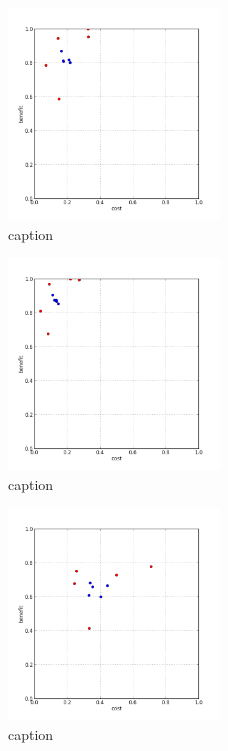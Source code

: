 %
\begin{figure}[!ht]
	\centering
	\includegraphics[width=0.5\textwidth]{img/p1figs/computeFrameStateCummulative_sectionCompareBetter_smooth12_tol24.png}
	\caption{caption}
\end{figure}
%
\begin{figure}[!ht]
	\centering
	\includegraphics[width=0.5\textwidth]{img/p1figs/computeFrameStateCummulative_sectionCompareBetter_smooth12_tol48.png}
	\caption{caption}
\end{figure}
%
\begin{figure}[!ht]
	\centering
	\includegraphics[width=0.5\textwidth]{img/p1figs/computeFrameStateCummulative_simpleCompare_smooth0_tol0.png}
	\caption{caption}
\end{figure}
